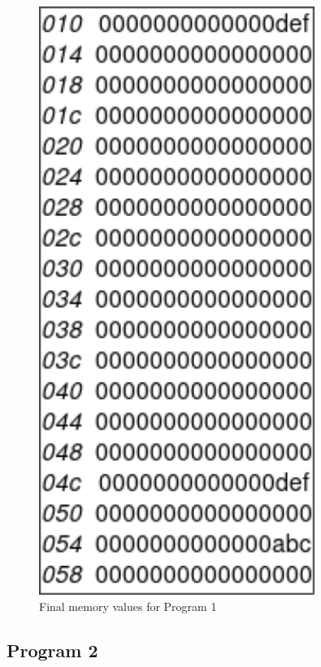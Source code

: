 \documentclass{article}
\begin{document}
\begin{minipage}{0.3\textwidth}
    \begin{figure}[H]
        \centering
        \includegraphics[width=0.8\textwidth]{./images/test1_mem.png}
        \caption{Final memory values for Program 1}
    \end{figure}
\end{minipage}

\subsection{Program 2}
\end{document}
